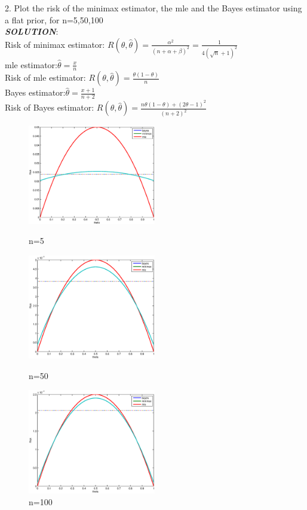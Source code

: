 \documentclass{article}
\theoremstyle{definition}
\theoremstyle{definition}
\theoremstyle{remark}
\begin{document}
2. Plot the risk of the minimax estimator, the mle and the Bayes estimator using a flat prior, for n=5,50,100\\
\emph{\textbf{SOLUTION}}:\\
Risk of minimax estimator: $R(\theta,\hat{\theta})=\frac{\alpha^2}{(n+\alpha+\beta)^2}=\frac{1}{4(\sqrt{n}+1)^2}$\\
mle estimator:$\hat{\theta}=\frac{x}{n}$\\
Risk of mle estimator: $R(\theta,\hat{\theta})=\frac{\theta(1-\theta)}{n}$\\
Bayes estimator:$\hat{\theta}=\frac{x+1}{n+2}$\\
Risk of Bayes estimator: $R(\theta,\hat{\theta})=\frac{n\theta(1-\theta)+(2\theta-1)^2}{(n+2)^2}$\\
\begin{figure}[!htbp]
\begin{minipage}[t]{0.3\linewidth}
\centering
\includegraphics[width=2.2in]{1.eps}
\caption{n=5}
\end{minipage}%
\begin{minipage}[t]{0.3\linewidth}
\centering
\includegraphics[width=2.2in]{2.eps}
\caption{n=50}
\end{minipage}
\begin{minipage}[t]{0.3\linewidth}
\centering
\includegraphics[width=2.2in]{3.eps}
\caption{n=100}
\end{minipage}
\end{figure}
\end{document}
